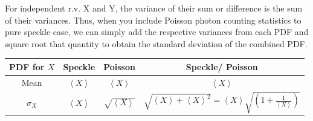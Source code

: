 \documentclass[11pt]{article}
\theoremstyle{definition}
\begin{document}
For independent r.v. X and Y, the variance of their sum or difference is the sum of their variances. Thus, when you include Poisson photon counting statistics to pure speckle case, we can simply add the respective variances from each PDF and square root that quantity to obtain the standard deviation of the combined PDF.   

\begin{table}[h!]
\centering
\begin{tabular}{|c|c|c|c|}
\hline
PDF for $X$ & Speckle & Poisson & Speckle/ Poisson \\
\hline
Mean & $\left<X\right>$ & $\left<X\right>$ & $\left<X\right>$ \\
\hline
$\sigma_X$ & $\left<X\right>$ & $\sqrt{\left<X\right>}$ & $\sqrt{\left<X\right> + \left<X\right>^2} = \left<X\right> \sqrt{(1 + \frac{1}{\left<X\right>})}$  \\
\hline
\end{tabular}
\label{tab:mytable}
\end{table}
\end{document}
